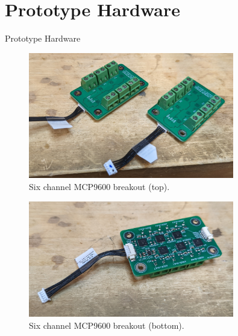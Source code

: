 \documentclass[UKenglish]{beamer}
\begin{document}
\section{Prototype Hardware}
\begin{frame}[allowframebreaks]{Prototype Hardware}
	
	\begin{figure}[h!]
		\centering
		\includegraphics[width=0.8\textwidth]{images/tc-board-top.jpg}
		\caption{Six channel MCP9600 breakout (top).}
	\end{figure}
	
	\begin{figure}[h!]
		\centering
		\includegraphics[width=0.8\textwidth]{images/tc-board-bottom.jpg}
		\caption{Six channel MCP9600 breakout (bottom).}
	\end{figure}
	

\end{frame}
\end{document}
